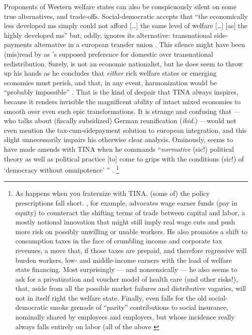 Proponents of Western welfare states can also be conspicuously silent on some true alternatives, and trade-offs.
Social-democratic \cite{Scharpf1997} accepts that ``the economically less developed \gls{ms} simply could not afford [\ldots] the same level of welfare [\ldots] [as] the highly developed \gls{ms}'' but, oddly, ignores its alternative:
transnational side-payments alternative in a european transfer union \citeyearpar[26]{Scharpf1997}.
This silence might have been (mis)read by \citeauthor{Moravcsik-2002-aa} \citeyearpar[619]{Moravcsik-2002-aa} as \citeauthor{Scharpf1997}'s supposed preference for domestic over transnational redistribution.
Surely, \citeauthor{Scharpf1997} is not an economic nationalist, but he does seem to throw up his hands as he concludes that \emph{either} rich welfare states or emerging economies must perish, and that, in any event, harmonization would be ``probably impossible'' \citeyearpar[26]{Scharpf1997}.
That is the kind of despair that TINA always inspires, because it renders invisible the magnificent ability of intact mixed economies to smooth over even such epic transformations.
It is strange and confusing that \citeauthor{Scharpf1997} --- who talks about (fiscally subsidized) German reunification (\emph{ibid.}) ---would not even mention the tax-cum-sidepayment solution to european integration, and this slight unnecessarily impairs his otherwise clear analysis.
Ominously, \citeauthor{Scharpf1997} seems to have made amends with TINA when he commands ``\emph{normative} (sic!) political theory as well as political practice [to] come to grips with the conditions (sic!) of `democracy without omnipotence' '' \citeyearpar[29]{Scharpf1997}.
\footnote{
	As happens when you fraternize with TINA, (some of) the policy prescriptions fall short.
	\citeauthor{Scharpf1997}, for example, advocates wage earner funds (pay in equity) to counteract the shifting terms of trade between capital and labor, a mostly notional innovation that might still imply real wage cuts and push more risk on possibly unwilling or unable workers.
	He also promotes a shift to consumption taxes in the face of crumbling income and corporate tax revenues, a move that, if those taxes are prepaid, and therefore regressive will burden workers, low- and middle-income earners with the load of welfare state financing.
	Most surprisingly --- and nonsensically --- he also seems to ask for a privatization and voucher model of health care (and other risks!), that, aside from all the possible market failures and distributive vagaries, will not in itself right the welfare state.
	Finally, \citeauthor{Scharpf1997} even falls for the old social-democratic smoke grenade of ``parity'' contributions to social insurance, nominally shared by employees and employers, but whose incidence really always falls entirely on labor (all of the above \citeyear[30-34]{Scharpf1997}
}

